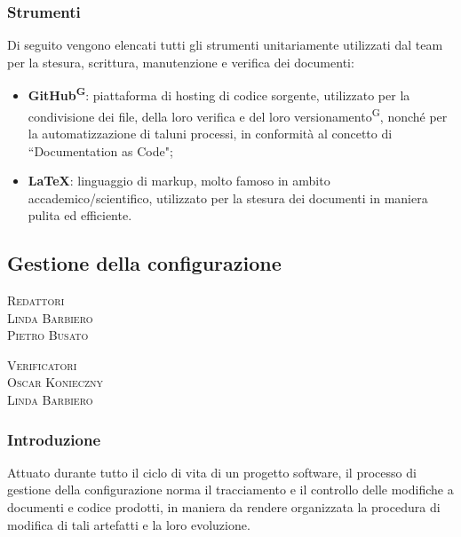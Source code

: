 \documentclass[8pt]{article}
\newcommand{\glossterm}[1]{#1\textsuperscript{G}} %
\begin{document}
\subsubsection{Strumenti}
Di seguito vengono elencati tutti gli strumenti unitariamente utilizzati dal team per la stesura, scrittura, manutenzione e verifica dei documenti:
\begin{itemize}
    \item \textbf{\glossterm{GitHub}}: piattaforma di hosting di codice sorgente, utilizzato per la condivisione dei file, della loro verifica e del loro \glossterm{versionamento}, nonché per la automatizzazione di taluni processi, in conformità al concetto di ``Documentation as Code";  
    \item \textbf{\LaTeX}: linguaggio di markup, molto famoso in ambito accademico/scientifico, utilizzato per la stesura dei documenti in maniera pulita ed efficiente.
\end{itemize}
\subsection{Gestione della configurazione} \label{sec:gestione}
\vspace{1em}
\begin{minipage}[t]{0.47\textwidth}
    \raggedleft
		{\large{\textsc{Redattori}}
			\vspace{3mm}
			{\\\large{\textsc{Linda Barbiero}\\}}
			{\large{\textsc{Pietro Busato}}}			
		}
		\vspace{8mm}
		
		{\large{\textsc{Verificatori}}
			\vspace{3mm}
			{\\\large{\textsc{Oscar Konieczny}\\}} 
			{\large{\textsc{Linda Barbiero}}}
			
		}
		\vspace{4mm}
	\end{minipage}

\subsubsection{Introduzione}

Attuato durante tutto il ciclo di vita di un progetto software, il processo di gestione della configurazione norma il tracciamento e il controllo delle modifiche a documenti e codice prodotti, in maniera da rendere organizzata la procedura di modifica di tali artefatti e la loro evoluzione.
\end{document}
